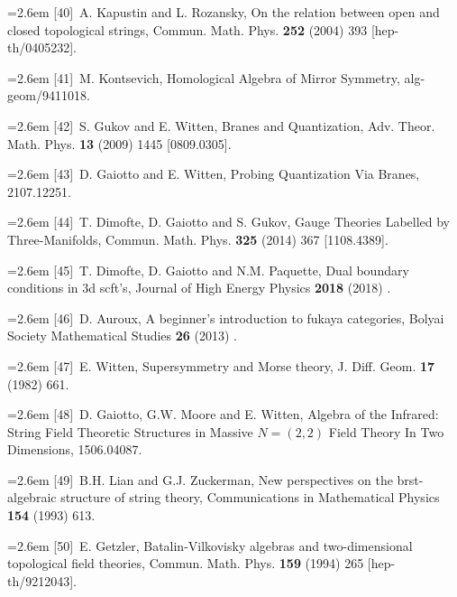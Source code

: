 \par\noindent\hangindent=2.6em [40]~A. Kapustin and L. Rozansky, On the relation between open and closed topological strings, Commun. Math. Phys. \textbf{252} (2004) 393 [hep-th/0405232].

\par\noindent\hangindent=2.6em [41]~M. Kontsevich, Homological Algebra of Mirror Symmetry, alg-geom/9411018.

\par\noindent\hangindent=2.6em [42]~S. Gukov and E. Witten, Branes and Quantization, Adv. Theor. Math. Phys. \textbf{13} (2009) 1445 [0809.0305].

\par\noindent\hangindent=2.6em [43]~D. Gaiotto and E. Witten, Probing Quantization Via Branes, 2107.12251.

\par\noindent\hangindent=2.6em [44]~T. Dimofte, D. Gaiotto and S. Gukov, Gauge Theories Labelled by Three-Manifolds, Commun. Math. Phys. \textbf{325} (2014) 367 [1108.4389].

\par\noindent\hangindent=2.6em [45]~T. Dimofte, D. Gaiotto and N.M. Paquette, Dual boundary conditions in 3d scft's, Journal of High Energy Physics \textbf{2018} (2018) .

\par\noindent\hangindent=2.6em [46]~D. Auroux, A beginner's introduction to fukaya categories, Bolyai Society Mathematical Studies \textbf{26} (2013) .

\par\noindent\hangindent=2.6em [47]~E. Witten, Supersymmetry and Morse theory, J. Diff. Geom. \textbf{17} (1982) 661.

\par\noindent\hangindent=2.6em [48]~D. Gaiotto, G.W. Moore and E. Witten, Algebra of the Infrared: String Field Theoretic Structures in Massive $N=(2,2)$ Field Theory In Two Dimensions, 1506.04087.

\par\noindent\hangindent=2.6em [49]~B.H. Lian and G.J. Zuckerman, New perspectives on the brst-algebraic structure of string theory, Communications in Mathematical Physics \textbf{154} (1993) 613.

\par\noindent\hangindent=2.6em [50]~E. Getzler, Batalin-Vilkovisky algebras and two-dimensional topological field theories, Commun. Math. Phys. \textbf{159} (1994) 265 [hep-th/9212043].

